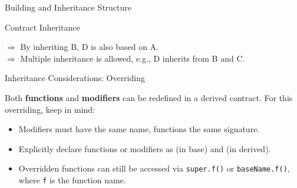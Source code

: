 \documentclass[handout]{beamer}
\begin{document}
\begin{frame}{Building and Inheritance Structure}

\vspace{0.5em}	
\begin{minipage}{0.48\textwidth}
	\begin{samplecode}{Contract Inheritance}
		
	\end{samplecode}
\end{minipage}	
\begin{minipage}{0.48\textwidth}
	\begin{figure}[t]
		\centering
		\begin{tikzpicture}[scale=1.0, every node/.style={scale=1.0}]
			
		\end{tikzpicture}
	\end{figure}
\end{minipage}	

\vspace{2.0em}

$\Rightarrow$ By inheriting B, D is also based on A.\\

\vspace{1.0em}
$\Rightarrow$ Multiple inheritance is allowed, e.g., D inherits from B and C.\\


\end{frame}


\begin{frame}{Inheritance Considerations: Overriding}

Both \textbf{functions} and \textbf{modifiers} can be redefined in a derived contract. For this overriding, keep in mind:
\vspace{0.5em}
\begin{itemize}
	\item<2-> Modifiers must have the same name, functions the same signature.
	\item<3-> Explicitly declare functions or modifiers as  (in base) and  (in derived).
	\item<4->  Overridden functions can still be accessed via \texttt{super.f()} or \texttt{baseName.f()}, where \texttt{f} is the function name.	
\end{itemize}

\vspace{1.5em}


\end{frame}
\end{document}
